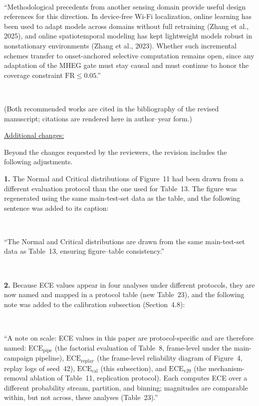 \documentclass[1p,12pt,authoryear]{elsarticle}
\begin{document}
~

``Methodological precedents from another sensing domain provide useful design references for this direction. In device-free Wi-Fi localization, online learning has been used to adapt models across domains without full retraining (Zhang et al., 2025), and online spatiotemporal modeling has kept lightweight models robust in nonstationary environments (Zhang et al., 2023). Whether such incremental schemes transfer to onset-anchored selective computation remains open, since any adaptation of the MHEG gate must stay causal and must continue to honor the coverage constraint $\mathrm{FR}\le0.05$.''

~

\noindent (Both recommended works are cited in the bibliography of the revised manuscript; citations are rendered here in author--year form.)

\newpage


\begin{large}
\noindent \underline{Additional changes:}
\end{large}

\vspace{10pt}

\noindent Beyond the changes requested by the reviewers, the revision includes the following adjustments.

\vspace{2mm}
\noindent \textbf{1.} The Normal and Critical distributions of Figure~11 had been drawn from a different evaluation protocol than the one used for Table~13. The figure was regenerated using the same main-test-set data as the table, and the following sentence was added to its caption:

~

``The Normal and Critical distributions are drawn from the same main-test-set data as Table~13, ensuring figure--table consistency.''

~

\noindent \textbf{2.} Because ECE values appear in four analyses under different protocols, they are now named and mapped in a protocol table (new Table~23), and the following note was added to the calibration subsection (Section~4.8):

~

``A note on scale: ECE values in this paper are protocol-specific and are therefore named: $\mathrm{ECE}_{\mathrm{pipe}}$ (the factorial evaluation of Table~8, frame-level under the main-campaign pipeline), $\mathrm{ECE}_{\mathrm{replay}}$ (the frame-level reliability diagram of Figure~4, replay logs of seed~42), $\mathrm{ECE}_{\mathrm{cal}}$ (this subsection), and $\mathrm{ECE}_{\mathrm{v29}}$ (the mechanism-removal ablation of Table~11, replication protocol). Each computes ECE over a different probability stream, partition, and binning; magnitudes are comparable within, but not across, these analyses (Table~23).''
\end{document}
